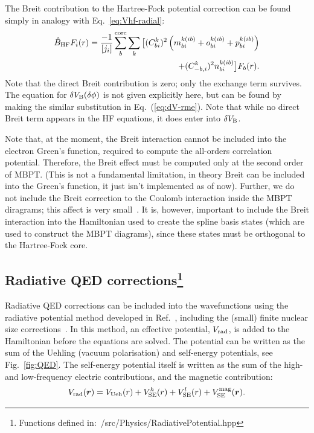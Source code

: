 \documentclass[10pt,twocolumn,a4paper]{article}%
\renewcommand{\v}[1]{\ensuremath{\boldsymbol{#1}}}		%
\newcommand{\be}{\begin{equation}}
\newcommand{\ee}{\end{equation}}
\begin{document}
The Breit contribution to the Hartree-Fock potential correction can be found simply in analogy with Eq.~\eqref{eq:Vhf-radial}:
\be\begin{split}\label{eq:HF_Breit}
\hat B_{\rm HF} F_i(r) = \frac{-1}{[j_i]}\sum_b^{\rm core}\sum_k \big[
(C^k_{bi})^2\left(m^{k(ib)}_{bi}+o^{k(ib)}_{bi}+p^{k(ib)}_{bi}\right)\\
+(C^k_{-b,i})^2n^{k(ib)}_{bi}
\big]F_b(r).
\end{split}
\ee
Note that the direct Breit contribution is zero; only the exchange term survives.
The equation for $\delta V_{\rm B}(\delta\phi)$ is not given explicitly here, 
but can be found by making the similar substitution in Eq.~(\ref{eq:dV-rme}).
Note that while no direct Breit term appears in the HF equations, it does enter into $\delta V_{\rm B}$.

%


Note that, at the moment, the Breit interaction cannot be included into the electron Green's function, required to compute the all-orders correlation potential.
Therefore, the Breit effect must be computed only at the second order of MBPT.
(This is not a fundamental limitation, in theory Breit can be included into the Green's function, it just isn't implemented as of now).
Further, we do not include the Breit correction to the Coulomb interaction inside the MBPT diragrams; this affect is very small~\cite{Derevianko2001}.
It is, however, important to include the Breit interaction into the Hamiltonian used to create the spline basis states (which are used to construct the MBPT diagrams), since these states must be orthogonal to the Hartree-Fock core.



\subsection[Radiative QED corrections]{Radiative QED corrections\footnote{Functions defined in:~/src/Physics/RadiativePotential.hpp}}

Radiative QED corrections can be included into the wavefunctions using the radiative potential method developed in Ref.~\cite{FlambaumQED2005}, including the (small) finite nuclear size corrections~\cite{GingesQED2015,Ginges2016}.
In this method, an effective potential, $V_{\rm rad}$,
is added to the Hamiltonian before the equations are solved.
The potential can be written as the sum of the Uehling (vacuum polarisation) and self-energy potentials, see Fig.~\ref{fig:QED}.
The self-energy potential itself is written as the sum of the high- and low-frequency electric contributions, and the magnetic contribution:
\be\label{eq:Vrad}
V_{\rm rad}(\v{r}) = V_{\rm Ueh}(r) + V_{\rm SE}^{h}(r) +  V_{\rm SE}^{l}(r) + V_{\rm SE}^{\rm mag}(\v{r}).
\ee
\end{document}
